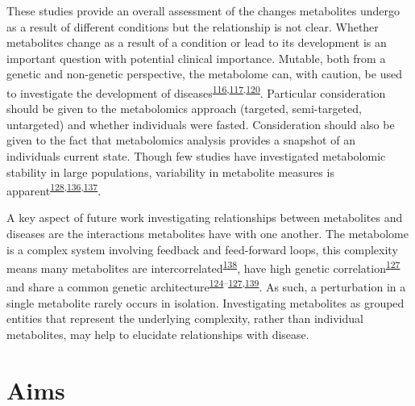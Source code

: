 \documentclass[11pt,twoside]{bristolthesis}
\begin{document}
These studies provide an overall assessment of the changes metabolites undergo as a result of different conditions but the relationship is not clear. Whether metabolites change as a result of a condition or lead to its development is an important question with potential clinical importance. Mutable, both from a genetic and non-genetic perspective, the metabolome can, with caution, be used to investigate the development of diseases\textsuperscript{\protect\hyperlink{ref-Su2014}{116},\protect\hyperlink{ref-Chu2019}{117},\protect\hyperlink{ref-Fearnley2016}{120}}. Particular consideration should be given to the metabolomics approach (targeted, semi-targeted, untargeted) and whether individuals were fasted. Consideration should also be given to the fact that metabolomics analysis provides a snapshot of an individuals current state. Though few studies have investigated metabolomic stability in large populations, variability in metabolite measures is apparent\textsuperscript{\protect\hyperlink{ref-Carayol2015}{128},\protect\hyperlink{ref-Sampson2013}{136},\protect\hyperlink{ref-Darst2019}{137}}.

A key aspect of future work investigating relationships between metabolites and diseases are the interactions metabolites have with one another. The metabolome is a complex system involving feedback and feed-forward loops, this complexity means many metabolites are intercorrelated\textsuperscript{\protect\hyperlink{ref-Rosato2018}{138}}, have high genetic correlation\textsuperscript{\protect\hyperlink{ref-Gallois2019}{127}} and share a common genetic architecture\textsuperscript{\protect\hyperlink{ref-Shin2014}{124}--\protect\hyperlink{ref-Gallois2019}{127},\protect\hyperlink{ref-Lotta2020}{139}}. As such, a perturbation in a single metabolite rarely occurs in isolation. Investigating metabolites as grouped entities that represent the underlying complexity, rather than individual metabolites, may help to elucidate relationships with disease.

\newpage

\hypertarget{aims}{%
\section{Aims}\label{aims}}
\end{document}
